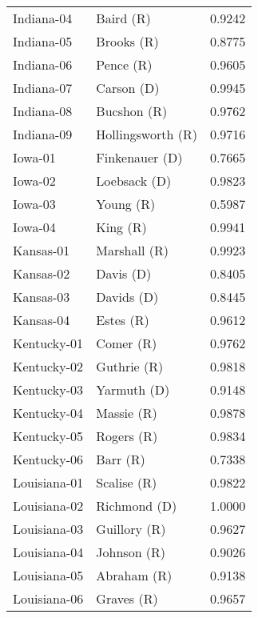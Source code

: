\begin{longtable}{llr}
        Indiana-04 &            Baird (R) &       0.9242 \\
        Indiana-05 &           Brooks (R) &       0.8775 \\
        Indiana-06 &            Pence (R) &       0.9605 \\
        Indiana-07 &           Carson (D) &       0.9945 \\
        Indiana-08 &          Bucshon (R) &       0.9762 \\
        Indiana-09 &    Hollingsworth (R) &       0.9716 \\
           Iowa-01 &       Finkenauer (D) &       0.7665 \\
           Iowa-02 &         Loebsack (D) &       0.9823 \\
           Iowa-03 &            Young (R) &       0.5987 \\
           Iowa-04 &             King (R) &       0.9941 \\
         Kansas-01 &         Marshall (R) &       0.9923 \\
         Kansas-02 &            Davis (D) &       0.8405 \\
         Kansas-03 &           Davids (D) &       0.8445 \\
         Kansas-04 &            Estes (R) &       0.9612 \\
       Kentucky-01 &            Comer (R) &       0.9762 \\
       Kentucky-02 &          Guthrie (R) &       0.9818 \\
       Kentucky-03 &          Yarmuth (D) &       0.9148 \\
       Kentucky-04 &           Massie (R) &       0.9878 \\
       Kentucky-05 &           Rogers (R) &       0.9834 \\
       Kentucky-06 &             Barr (R) &       0.7338 \\
      Louisiana-01 &          Scalise (R) &       0.9822 \\
      Louisiana-02 &         Richmond (D) &       1.0000 \\
      Louisiana-03 &         Guillory (R) &       0.9627 \\
      Louisiana-04 &          Johnson (R) &       0.9026 \\
      Louisiana-05 &          Abraham (R) &       0.9138 \\
      Louisiana-06 &           Graves (R) &       0.9657 \\

\end{longtable}
